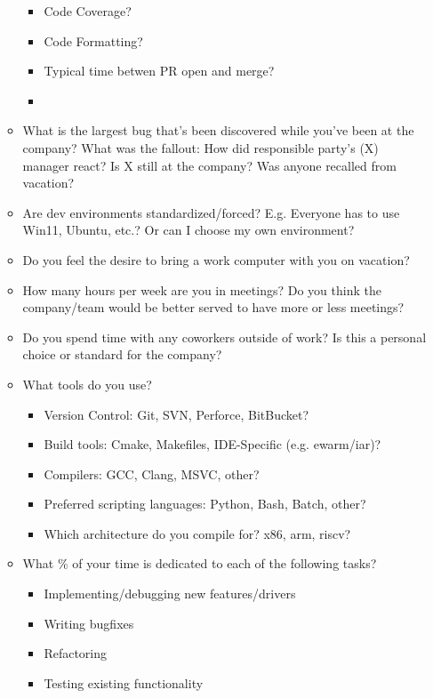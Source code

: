 \documentclass{article}
\begin{document}
\begin{itemize}
\begin{itemize}
\begin{itemize}
			            \item Code Coverage?
			            \item Code Formatting?
			            \item Typical time betwen PR open and merge?
			            \item
		            \end{itemize}
		      \item What is the largest bug that's been discovered while you've been at the company? What was the fallout: How did responsible party's (X) manager react? Is X still at the company? Was anyone recalled from vacation?
		      \item Are dev environments standardized/forced? E.g. Everyone has to use Win11, Ubuntu, etc.? Or can I choose my own environment?
		      \item Do you feel the desire to bring a work computer with you on vacation?
		      \item How many hours per week are you in meetings? Do you think the company/team would be better served to have more or less meetings?
		      \item Do you spend time with any coworkers outside of work? Is this a personal choice or standard for the company?
		      \item What tools do you use?
		            \begin{itemize}
			            \item Version Control: Git, SVN, Perforce, BitBucket?
			            \item Build tools: Cmake, Makefiles, IDE-Specific (e.g. ewarm/iar)?
			            \item Compilers: GCC, Clang, MSVC, other?
			            \item Preferred scripting languages: Python, Bash, Batch, other?
			            \item Which architecture do you compile for? x86, arm, riscv?
		            \end{itemize}
		      \item What \% of your time is dedicated to each of the following tasks?
		            \begin{itemize}
			            \item Implementing/debugging new features/drivers
			            \item Writing bugfixes
			            \item Refactoring
			            \item Testing existing functionality

\end{itemize}
\end{itemize}
\end{itemize}
\end{document}
